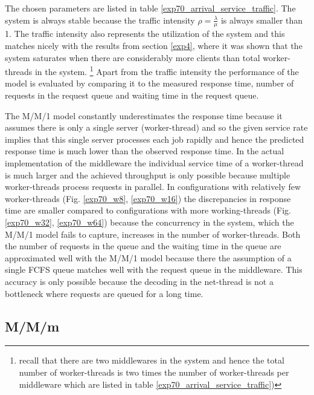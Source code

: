 \documentclass[report.tex]{subfiles}
\begin{document}
The chosen parameters are listed in table \ref{exp70_arrival_service_traffic}.
The system is always stable because the traffic intensity  $\rho= \frac{\lambda}{\mu}$ is always smaller than 1.
The traffic intensity also represents the utilization of the system and this matches nicely with the results from section \ref{exp4}, where it was shown that the system saturates when there are considerably more clients than total worker-threads in the system. \footnote{recall that there are two middlewares in the system and hence the total number of worker-threads is two times the number of worker-threads per middleware which are listed in table \ref{exp70_arrival_service_traffic})}
Apart from the traffic intensity the performance of the model is evaluated by comparing it to the measured response time, number of requests in the request queue and waiting time in the request queue.

The M/M/1 model constantly underestimates the response time because it assumes there is only a single server (worker-thread) and so the given service rate implies that this single server processes each job rapidly and hence the predicted response time is much lower than the observed response time. In the actual implementation of the middleware the individual service time of a worker-thread is much larger and the achieved throughput is only possible because multiple worker-threads process requests in parallel.
In configurations with relatively few worker-threads (Fig. \ref{exp70_w8}, \ref{exp70_w16}) the discrepancies in response time are smaller compared to configurations with more working-threads (Fig. \ref{exp70_w32}, \ref{exp70_w64}) because the concurrency in the system, which the M/M/1 model fails to capture, increases in the number of worker-threads.
Both the number of requests in the queue and the waiting time in the queue are approximated well with the M/M/1 model because there the assumption of a single FCFS queue matches well with the request queue in the middleware. This accuracy is only possible because the decoding in the net-thread is not a bottleneck where requests are queued for a long time. 

\subsection{M/M/m}

\end{document}
